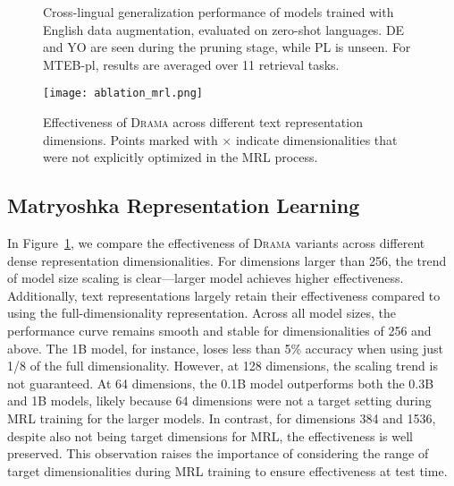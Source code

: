 \documentclass[]{fairmeta}
\newcommand{\ourmodel}{\textsc{Drama}}
\begin{document}
\begin{figure}[t]
    \centering
    \begin{minipage}{0.49\textwidth}
        \centering
{}
    \caption{Cross-lingual generalization performance of models trained with English data augmentation, evaluated on zero-shot languages.
    DE and YO are seen during the pruning stage, while PL is unseen.
    For MTEB-pl, results are averaged over 11 retrieval tasks.}
    \label{fig:crosslingual_generalization}
    \end{minipage}
    \hfill
    \begin{minipage}{0.49\textwidth}
        \centering
        \texttt{[image: ablation\_mrl.png]}
        \caption{Effectiveness of \ourmodel{} across different text representation dimensions. Points marked with $\times$ indicate dimensionalities that were not explicitly optimized in the MRL process.}
        \label{fig:mrl}
    \end{minipage}
\end{figure}

\subsection{Matryoshka Representation Learning}\label{sec:analysis:mrl}
In Figure~\ref{fig:mrl}, we compare the effectiveness of \ourmodel{} variants across different dense representation dimensionalities.
For dimensions larger than 256, the trend of model size scaling is clear---larger model achieves higher effectiveness. 
Additionally, text representations largely retain their effectiveness compared to using the full-dimensionality representation.
Across all model sizes, the performance curve remains smooth and stable for dimensionalities of 256 and above. The 1B model, for instance, loses less than 5\% accuracy when using just 1/8 of the full dimensionality.
However, at 128 dimensions, the scaling trend is not guaranteed.
At 64 dimensions, the 0.1B model outperforms both the 0.3B and 1B models, likely because 64 dimensions were not a target setting during MRL training for the larger models.
In contrast, for dimensions 384 and 1536, despite also not being target dimensions for MRL, the effectiveness is well preserved.
This observation raises the importance of considering the range of target dimensionalities during MRL training to ensure effectiveness at test time.
\end{document}
